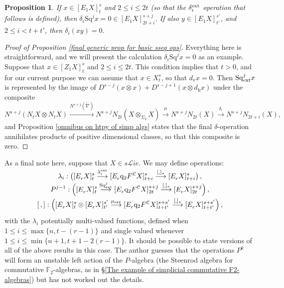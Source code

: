 \documentclass[11pt]{amsart} \renewcommand{\baselinestretch}{1.2}
\theoremstyle{plain}
\newtheorem{prop}[thm]{Proposition}
\numberwithin{equation}{section} %
\theoremstyle{plain}
\newtheorem{prop}[thm]{Proposition}
\numberwithin{equation}{chapter} %
\renewcommand{\to}{\longrightarrow}
\newcommand{\scrL}{\mathscr{L}}
\newcommand{\calc}{\mathcal{C}}
\newcommand{\quadgrad}[1]{\mathrm{q}_{#1}}
\newcommand{\Nabla}{\nabla}
\newcommand{\Sq}{\mathrm{Sq}}
\newcommand{\F}{\mathbb{F}}
\newcommand{\liealgs}{{\scrL\!\textit{ie}}}
\newcommand{\Ftwo}{\F_2}
\newcommand{\Edownup}[5]{[E_{#1}^{#2}#3]^{#4}_{#5}}
\newcommand{\EZdownup}[5]{[Z^{#2}_{#1}#3]^{#4}_{#5}}
\newcommand{\dver}{_\mathrm{v}}
\newcommand{\dhor}{_\mathrm{h}}
\begin{document}
\begin{second quadrant homotopy sseq operations}
\begin{prop}
If $x\in \Edownup{1}{}{X}{s}{t}$ and $2\leq i \leq 2t$ (so that the $\delta^\textup{ext}_i$ operation that follows is defined), then $\delta_i\Sq^jx=0\in \Edownup{1}{}{X}{s+j}{2t+i}$. If also $y\in \Edownup{1}{}{X}{s'}{t'}$, and $2\leq i <t+t'$, then $\delta_i(xy)=0$.
\end{prop}
\begin{proof}[Proof of Proposition \ref{final generic prop for basic sseq ops}]
Everything here is straightforward, and we will present the calculation 
$\delta_i\Sq^jx=0$ as an example.
Suppose that $x\in \EZdownup{1}{}{X}{s}{t}$ and $2\leq i\leq 2t$. This condition implies that $t>0$, and for our current purpose we can assume that $x\in X^s_t$, so that $d\dver x=0$.  Then $\Sq^j_\textup{ext}x$ is represented by the image of $D^{s-j}(x\otimes x)+D^{s-j+1}(x\otimes d\dhor x)$ under the composite
\[N^{s+j}(N_tX\otimes N_tX)\overset{N^{s+j}(\widetilde{\Nabla})}{\to}N^{s+j}N_{2t}(X\otimes_{\Sigma_2} X)\overset{\mu}{\to}N^{s+j}N_{2t}(X)\overset{\delta_i}{\to}N^{s+j}N_{2t+i}(X),\]
and Proposition \ref{omnibus on htpy of simp algs} states that the final $\delta$-operation annihilates products of positive dimensional classes, so that this composite is zero.
\end{proof}

As a final note here, suppose that $X\in s\liealgs$. We may define operations:
\begin{gather*}
\lambda_i:\left(\Edownup{r}{}{X}{s}{t} \smash{{}\overset{\lambda_i^\textup{ext}}{\to}{}} \Edownup{r}{}{\quadgrad{2}F^\calc X}{s}{t+i}\smash{{}\overset{[,]_*}{\to} {}}
\Edownup{r}{}{X}{s}{t+i}\right),
\\
P^{j-1}:\left(\Edownup{r}{}{X}{s}{t}   \smash{{}\overset{\Sq^j_\textup{ext}}{\to}{}} \Edownup{r}{}{\quadgrad{2}F^\calc X}{s+j}{2t}\smash{{}\overset{[,]_*}{\to} {}}
\Edownup{r}{}{X}{s+j}{2t}\right),\\
[\,,]:\left(\Edownup{r}{}{X}{s}{t}\otimes \Edownup{r}{}{X}{s'}{t'}\smash{{}\overset{\mu_\textup{ext}}{\to}{}} \Edownup{r}{}{\quadgrad{2}F^\calc X}{s+s'}{t+t'}\smash{{}\overset{[,]_*}{\to} {}}
\Edownup{r}{}{X}{s+s'}{t+t'}\right),
\end{gather*}
with the $\lambda_i$ potentially multi-valued functions,  defined when $1\leq i\leq \max\{n,t-(r-1)\}$ %
and single valued whenever $1\leq i\leq\min\{n+1,t+1-2(r-1)\}$.
It should be possible to state versions of all of the above results in this case. The author guesses that the operations $P^{k}$ will form an unstable left action of the $P$-algebra (the Steenrod algebra for commutative $\Ftwo$-algebras, as in \S\ref{The example of simplicial commutative F2-algebras}) but has not worked out the details.


\end{second quadrant homotopy sseq operations}
\end{document}
